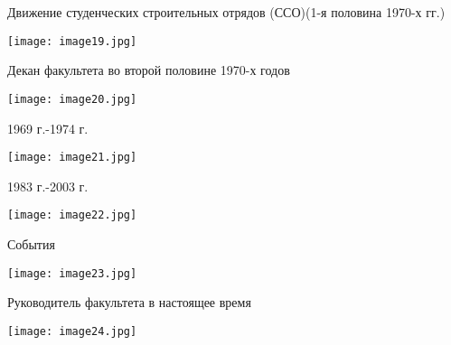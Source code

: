 \documentclass[pdf,hyperref={unicode}, aspectratio=43, serif,11pt]{beamer}
\begin{document}
\begin{frame}{Движение студенческих строительных отрядов (ССО)(1-я половина 1970-х гг.)}
    \begin{center}
        \texttt{[image: image19.jpg]}
    \end{center}
\end{frame}
\begin{frame}{Декан факультета во второй половине 1970-х годов}
    \begin{center}
        \texttt{[image: image20.jpg]} \\
        \caption{Дмитрий Григорьевич Курбан}
    \end{center}
\end{frame}
\begin{frame}{1969 г.-1974 г.}
    \begin{center}
        \texttt{[image: image21.jpg]} \\
        \caption{Вениамин Константинович Инножарский(декан физмата)-одним из первых в нашем вузе стал преподавать программирование}
    \end{center}
\end{frame}
\begin{frame}{1983 г.-2003 г.}
    \begin{center}
        \texttt{[image: image22.jpg]} \\
        \caption{Байдак Геннадий Васильевич(декан физмата)}
    \end{center}
\end{frame}
\begin{frame}{События}
    \begin{center}
        \texttt{[image: image23.jpg]}
    \end{center}
\end{frame}
\begin{frame}{Руководитель факультета в настоящее время}
    \begin{center}
        \texttt{[image: image24.jpg]} \\
        \caption{Т.Н. Можарова(профессор, кандидат физико-математических наук)}
    \end{center}
\end{frame}
\end{document}
